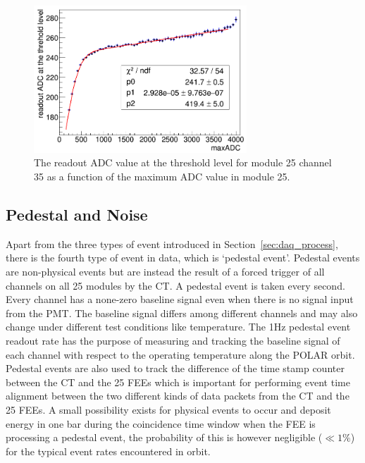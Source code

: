 \documentclass[preprint,sort&compress,12pt]{elsarticle}
\begin{document}
\begin{figure}[!ht]
\centering
\includegraphics[width=8cm]{images/non_linearity.png}
\caption{The readout ADC value at the threshold level for module 25 channel 35 as a function of the maximum ADC value in module 25.}\label{fig:non-linear}
\end{figure}

\subsection{Pedestal and Noise}\label{sec:pedestal_noise}

Apart from the three types of event introduced in Section~\ref{sec:daq_process}, there is the fourth type of event in data, which is `pedestal event'. Pedestal events are non-physical events but are instead the result of a forced trigger of all channels on all 25 modules by the CT. A pedestal event is taken every second. Every channel has a none-zero baseline signal even when there is no signal input from the PMT. The baseline signal differs among different channels and may also change under different test conditions like temperature. The 1Hz pedestal event readout rate has the purpose of measuring and tracking the baseline signal of each channel with respect to the operating temperature along the POLAR orbit. Pedestal events are also used to track the difference of the time stamp counter between the CT and the 25 FEEs which is important for performing event time alignment between the two different kinds of data packets from the CT and the 25 FEEs. A small possibility exists for physical events to occur and deposit energy in one bar during the coincidence time window when the FEE is processing a pedestal event, the probability of this is however negligible ($\ll1\%$) for the typical event rates encountered in orbit.
\end{document}
